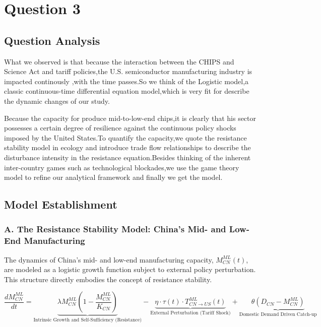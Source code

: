 \documentclass{apmcmthesis}
\begin{document}
\section{Question 3}

\subsection{Question Analysis}
What we observed is that because the interaction between the CHIPS and Science Act and  tariff policies,the U.S. semiconductor manufacturing industry is impacted continously ,with the time passes.So we think of the Logistic model,a classic continuous-time differential equation model,which is very fit for describe the dynamic changes of our study.

Because the capacity for produce mid-to-low-end chips,it is clearly that his sector possesses a certain degree of resilience against the continuous policy shocks imposed by the United States.To quantify the capacity,we quote the resistance stability model in ecology and introduce trade flow relationships to describe the disturbance intensity in the resistance equation.Besides thinking of the inherent inter-country games such as technological blockades,we use the game theory model to refine our analytical framework and finally we get the model.
\subsection{Model Establishment}
\subsubsection{A. The Resistance Stability Model: China's Mid- and Low-End Manufacturing}

The dynamics of China's mid- and low-end manufacturing capacity, $M_{CN}^{ML}(t)$, are modeled as a logistic growth function subject to external policy perturbation. This structure directly embodies the concept of resistance stability.

$$
\frac{dM_{CN}^{ML}}{dt} = \underbrace{\lambda M_{CN}^{ML} \left(1 - \frac{M_{CN}^{ML}}{K_{CN}}\right)}_{\text{Intrinsic Growth and Self-Sufficiency (Resistance)}} - \underbrace{\eta \cdot \tau(t) \cdot T_{CN \to US}^{ML}(t)}_{\text{External Perturbation (Tariff Shock)}} + \underbrace{\theta (D_{CN} - M_{CN}^{ML})}_{\text{Domestic Demand Driven Catch-up}}
$$
\end{document}

